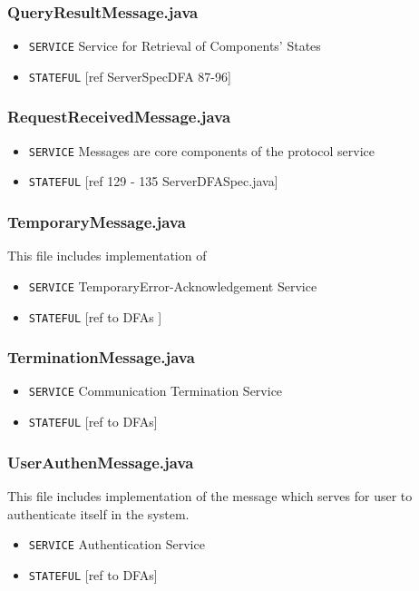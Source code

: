 \documentclass[12pt]{usenixsubmit}
\begin{document}
     \subsubsection{QueryResultMessage.java}
     \begin{itemize}
     \item {\tt SERVICE} Service for Retrieval of Components' States  
     \item {\tt STATEFUL} [ref  ServerSpecDFA  87-96]
     \end{itemize}

     \subsubsection{RequestReceivedMessage.java}
     \begin{itemize}
     \item {\tt SERVICE}  Messages are core components of the protocol service
     \item {\tt STATEFUL} [ref 129 - 135 ServerDFASpec.java]
     \end{itemize}

     \subsubsection{TemporaryMessage.java}This file includes implementation of 
     \begin{itemize}
     \item {\tt SERVICE}  TemporaryError-Acknowledgement Service
     \item {\tt STATEFUL} [ref to DFAs ]
     \end{itemize}

     \subsubsection{TerminationMessage.java}
     \begin{itemize}
     \item {\tt SERVICE}  Communication Termination Service
     \item {\tt STATEFUL} [ref to DFAs]
     \end{itemize}

     \subsubsection{UserAuthenMessage.java}This file includes implementation of the message which serves for user to authenticate itself in the system.
     \begin{itemize}
     \item {\tt SERVICE}  Authentication Service
     \item {\tt STATEFUL} [ref to DFAs]
     \end{itemize}
\end{document}
